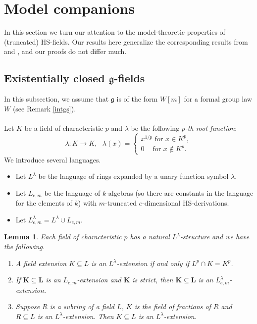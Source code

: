 \documentclass[10pt]{amsart}
\newtheorem{lemma}[theorem]{Lemma}
\theoremstyle{definition}
\begin{document}
\section{Model companions}\label{secmc}
\noindent
In this section we turn our attention to the model-theoretic properties of (truncated) HS-fields. Our results here generalize the corresponding results from \cite{Zieg2} and \cite{K3}, and our proofs do not differ much.

\subsection{Existentially closed $\mathfrak{g}$-fields}\label{sececg}
In this subsection, we assume that $\mathfrak{g}$ is of the form $W[m]$ for a formal group law $W$ (see Remark \ref{intgs}).
\\
\\
Let $K$ be a field of characteristic $p$ and $\lambda$ be the following \emph{$p$-th root function}:
$$\lambda:K\to K,\ \ \ \lambda(x)= \begin{cases} x^{1/p}\text{ for }x\in K^p, \\ 0\ \ \ \ \text{ for }x\notin K^p. \end{cases}$$
We introduce several languages.
\begin{itemize}
\item Let $L^{\lambda}$ be the language of rings expanded by a unary function symbol $\lambda$.

\item Let $L_{e,m}$ be the language of $k$-algebras (so there are constants in the language for the elements of $k$) with $m$-truncated $e$-dimensional HS-derivations.

\item Let $L^{\lambda}_{e,m}=L^{\lambda}\cup L_{e,m}$.
\end{itemize}
\noindent
\begin{lemma}\label{lamb}
Each field of characteristic $p$ has a natural $L^{\lambda}$-structure and we have the following.
\begin{enumerate}
\item A field extension $K\subseteq L$ is an $L^{\lambda}$-extension if and only if $L^p\cap K=K^p$.

\item If $\mathbf{K}\subseteq \mathbf{L}$ is an $L_{e,m}$-extension and $\mathbf{K}$ is strict, then $\mathbf{K}\subseteq \mathbf{L}$ is an $L^{\lambda}_{e,m}$-extension.

\item Suppose $R$ is a subring of a field $L$, $K$ is the field of fractions of $R$ and $R\subseteq L$ is an $L^{\lambda}$-extension. Then $K\subseteq L$ is an $L^{\lambda}$-extension.
\end{enumerate}
\end{lemma}
\end{document}
